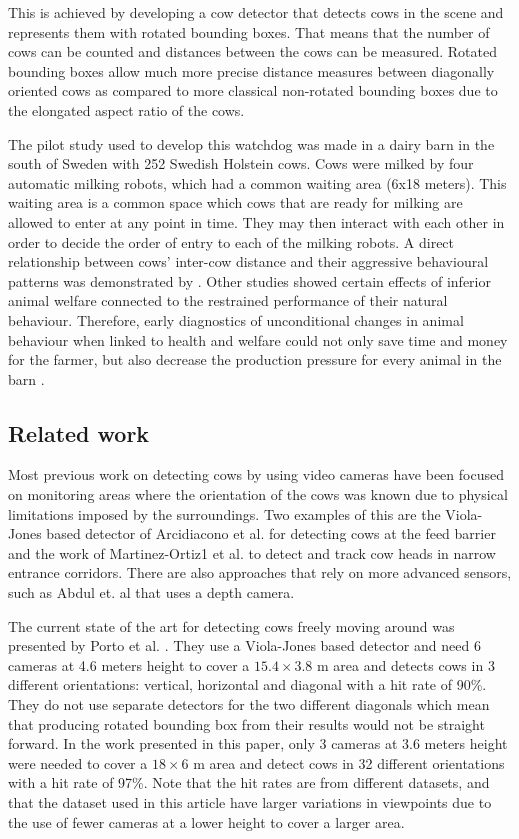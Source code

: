\documentclass{cta-author}
\begin{document}
This is achieved by developing a cow detector that detects cows in the scene and represents them with rotated bounding boxes. That means that the number of cows can be counted and distances between the cows can be measured. Rotated bounding boxes allow much more precise distance measures between diagonally oriented cows as compared to more classical non-rotated bounding boxes due to the elongated aspect ratio of the cows.

The pilot study used to develop this watchdog was made in a dairy barn in the south of Sweden with 252 Swedish Holstein cows. Cows were milked by four automatic milking robots, which had a common waiting area (6x18 meters). This waiting area is a common space which cows that are ready for milking are allowed to enter at any point in time. They may then interact with each other in order to decide the order of entry to each of the milking robots. A direct relationship between cows' inter-cow distance and their aggressive behavioural patterns was demonstrated by \cite{DeVriesetal2004}. Other studies \cite{Hemsworth2003, Kilgour2012, guzhva2016feasibility} showed certain effects of inferior animal welfare connected to the restrained performance of their natural behaviour. Therefore, early diagnostics of unconditional changes in animal behaviour when linked to health and welfare could not only save time and money for the farmer, but also decrease the production pressure for every animal in the barn \cite{Polikarpusetal2015}.

\subsection{Related work}
Most previous work on detecting cows by using video cameras have been focused on monitoring areas where the orientation of the cows was known due to physical limitations imposed by the surroundings. Two examples of this are the Viola-Jones based detector of Arcidiacono et al. \cite{Arcidiacono2012} for detecting cows at the feed barrier and the work of Martinez-Ortiz1 et al. \cite{martinez2013video} to detect and track cow heads in narrow entrance corridors. There are also approaches that rely on more advanced sensors, such as Abdul et. al \cite{abdul2016locomotion} that uses a depth camera.

The current state of the art for detecting cows freely moving around was presented by Porto et al. \cite{porto2015automatic}. They use a Viola-Jones based detector and need 
6 cameras at 4.6 meters height to cover a $15.4 \times 3.8$ m area and detects cows in 3 different orientations: vertical, horizontal and diagonal with a hit rate of 90\%. They do not use separate detectors for the two different diagonals which mean that producing rotated bounding box from their results would not be straight forward. In the work presented in this paper, only 3 cameras at 3.6 meters height were needed to cover a $18 \times 6$ m area and detect cows in 32 different orientations with a hit rate of 97\%. Note that the hit rates are from different datasets, and that the dataset used in this article have larger variations in viewpoints due to the use of fewer cameras at a lower height to cover a larger area.
\end{document}
